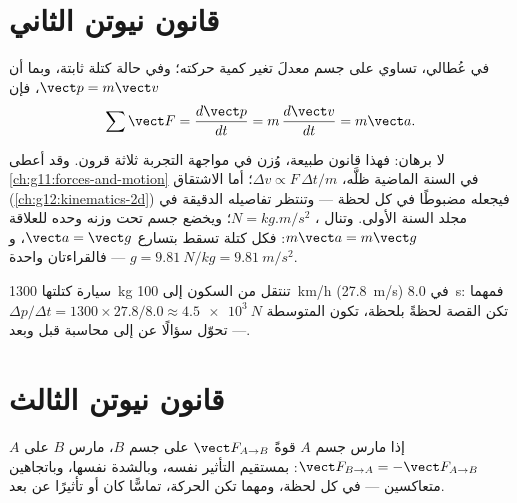 \section{قانون نيوتن الثاني}

\begin{theorem}\label{thm:g12:newtons-laws:second}
في  عُطالي، تساوي  على جسم معدلَ تغير
كمية حركته؛ وفي حالة كتلة ثابتة، وبما أن $\vect p = m\vect v$، فإن
\[
\sum \vect F = \frac{d\vect p}{dt} = m\,\frac{d\vect v}{dt} = m \vect a .
\]
\end{theorem}
\admitted

\begin{remark}\label{rem:g12:newtons-laws:nature}
لا برهان: فهذا قانون طبيعة، وُزن في مواجهة التجربة ثلاثة
قرون. وقد أعطى \cref{ch:g11:forces-and-motion} في السنة الماضية ظلَّه،
$\Delta v \propto F\,\Delta t/m$؛ أما الاشتقاق (\cref{ch:g12:kinematics-2d}) فيجعله
مضبوطًا في كل لحظة --- وتنتظر تفاصيله الدقيقة في مجلد السنة الأولى. وتنال 
، $\unit{N} = \unit{kg.m/s^2}$؛ ويخضع جسم تحت وزنه وحده للعلاقة
$m\vect a = m\vect g$: فكل كتلة تسقط بتسارع $\vect a = \vect g$، و
$g = \qty{9.81}{N/kg} = \qty{9.81}{m/s^2}$ --- فالقراءتان واحدة.
\end{remark}

\begin{example}\label{ex:g12:newtons-laws:average}
سيارة كتلتها \qty{1300}{kg} تنتقل من السكون إلى \qty{100}{km/h} (\qty{27.8}{m/s}) في
\qty{8.0}{s}: فمهما تكن القصة لحظةً بلحظة، تكون  المتوسطة
$\Delta p/\Delta t = 1300 \times 27.8/8.0 \approx \qty{4.5e3}{N}$ ---  تحوّل
سؤالًا عن  إلى محاسبة قبل وبعد.
\end{example}

\section{قانون نيوتن الثالث}

\begin{theorem}\label{thm:g12:newtons-laws:third}
إذا مارس جسم $A$ قوةً $\vect F_{A \to B}$ على جسم $B$، مارس $B$ على
$A$  $\vect F_{B \to A} = -\vect F_{A \to B}$: بمستقيم التأثير نفسه، وبالشدة
نفسها، وباتجاهين متعاكسين --- في كل لحظة، ومهما تكن الحركة، تماسًّا كان أو
تأثيرًا عن بعد.
\end{theorem}
\admitted


